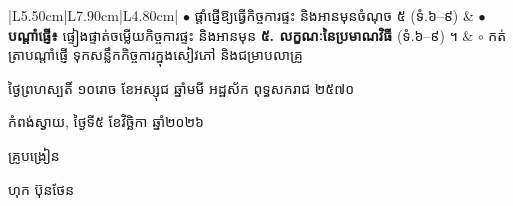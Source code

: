 \documentclass[a4paper,10pt]{article}
\begin{document}
{\begin{longtable}{|L{5.50cm}|L{7.90cm}|L{4.80cm}|}
$\bullet$ ផ្ដាំផ្ញើឱ្យធ្វើកិច្ចការផ្ទះ និងអានមុនចំណុច ៥ (ទំ.៦–៩)
&
$\bullet$ \textbf{បណ្ដាំផ្ញើ៖} ផ្ទៀងផ្ទាត់ចម្លើយកិច្ចការផ្ទះ និងអានមុន \textbf{៥. លក្ខណៈនៃប្រមាណវិធី} (ទំ.៦–៩) ។
&
$\circ$ កត់ត្រាបណ្ដាំផ្ញើ ទុកសន្លឹកកិច្ចការក្នុងសៀវភៅ និងជម្រាបលាគ្រូ \\
\hline
\end{longtable}}

\vspace{6pt}
{\centering
\hspace*{5.2cm}\begin{minipage}{11.5cm}
  \centering
  ថ្ងៃព្រហស្បតិ៍ ១០រោច ខែអស្សុជ ឆ្នាំមមី អដ្ឋស័ក ពុទ្ធសករាជ ២៥៧០\par
  កំពង់ស្វាយ, ថ្ងៃទី៥ ខែវិច្ឆិកា ឆ្នាំ២០២៦\par
  \vspace{2pt}
  {\muol គ្រូបង្រៀន\par}
  \vspace{32pt}
  \hfill{\muol ហុក ប៊ុនថែន}\hspace*{1.4cm}
\end{minipage}\par}
\end{document}
